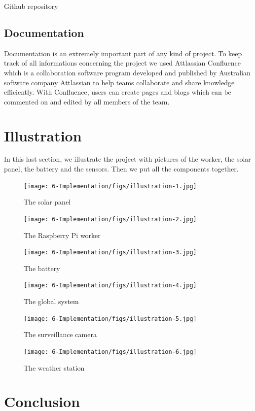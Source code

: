 \begin{itemize}
        Github repository\cite{color-transfer}

    \end{itemize}


    \subsection{Documentation}
        Documentation is an extremely important part of any kind of project. To keep track of all informations
        concerning the project we used Attlassian Confluence which is a collaboration software
        program developed and published by Australian software company Attlassian to help teams collaborate
        and share knowledge efficiently. With Confluence, users can create pages and blogs which can be
        commented on and edited by all members of the team.

\section{Illustration}
    In this last section, we illustrate the project with pictures of the worker, the solar panel, the battery
    and the sensors. Then we put all the components together.

    \begin{figure}[!h]\centering
        \texttt{[image: 6-Implementation/figs/illustration-1.jpg]}
        \caption{The solar panel}
    \end{figure}

    \begin{figure}[!h]\centering
        \texttt{[image: 6-Implementation/figs/illustration-2.jpg]}
        \caption{The Raspberry Pi worker}
    \end{figure}

    \begin{figure}[!h]\centering
        \texttt{[image: 6-Implementation/figs/illustration-3.jpg]}
        \caption{The battery}
    \end{figure}

    \begin{figure}[!h]\centering
        \texttt{[image: 6-Implementation/figs/illustration-4.jpg]}
        \caption{The global system}
    \end{figure}

    \begin{figure}[!h]\centering
        \texttt{[image: 6-Implementation/figs/illustration-5.jpg]}
        \caption{The surveillance camera}
    \end{figure}

    \begin{figure}[!h]\centering
        \texttt{[image: 6-Implementation/figs/illustration-6.jpg]}
        \caption{The weather station}
    \end{figure}

    \clearpage

\section{Conclusion}
    